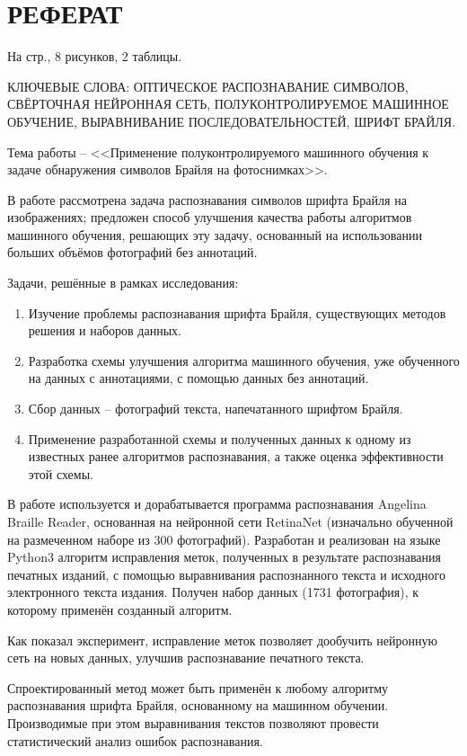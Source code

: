 \documentclass{main.tex}[subfiles]
\begin{document}
\thispagestyle{empty}
\section*{РЕФЕРАТ}

На \pageref*{LastPage} стр., 8 рисунков, 2 таблицы.

КЛЮЧЕВЫЕ СЛОВА: ОПТИЧЕСКОЕ РАСПОЗНАВАНИЕ СИМВОЛОВ, СВЁРТОЧНАЯ НЕЙРОННАЯ СЕТЬ, ПОЛУКОНТРОЛИРУЕМОЕ МАШИННОЕ ОБУЧЕНИЕ, ВЫРАВНИВАНИЕ ПОСЛЕДОВАТЕЛЬНОСТЕЙ, ШРИФТ БРАЙЛЯ.

Тема работы -- <<Применение полуконтролируемого машинного обучения к задаче обнаружения символов Брайля на фотоснимках>>.

В работе рассмотрена задача распознавания символов шрифта Брайля на изображениях; предложен способ улучшения качества работы алгоритмов машинного обучения, решающих эту задачу, основанный на использовании больших объёмов фотографий без аннотаций.

Задачи, решённые в рамках исследования:
\begin{enumerate}[noitemsep]
    \item Изучение проблемы распознавания шрифта Брайля, существующих методов решения и наборов данных.
    \item Разработка схемы улучшения алгоритма машинного обучения, уже обученного на данных с аннотациями, с помощью данных без аннотаций.
    \item Сбор данных -- фотографий текста, напечатанного шрифтом Брайля.
    \item Применение разработанной схемы и полученных данных к одному из известных ранее алгоритмов распознавания, а также оценка эффективности этой схемы.
\end{enumerate}

В работе используется и дорабатывается программа распознавания Angelina Braille Reader, основанная на нейронной сети Retina\-Net (изначально обученной на размеченном наборе из 300 фотографий).
Разработан и реализован на языке Python3 алгоритм исправления меток, полученных в результате распознавания печатных изданий, с помощью выравнивания распознанного текста и исходного электронного текста издания.
Получен набор данных (1731 фотография), к которому применён созданный алгоритм.

Как показал эксперимент, исправление меток позволяет дообучить нейронную сеть на новых данных, улучшив распознавание печатного текста.

Спроектированный метод может быть применён к любому алгоритму распознавания шрифта Брайля, основанному на машинном обучении.
Производимые при этом выравнивания текстов позволяют провести статистический анализ ошибок распознавания.
\end{document}
